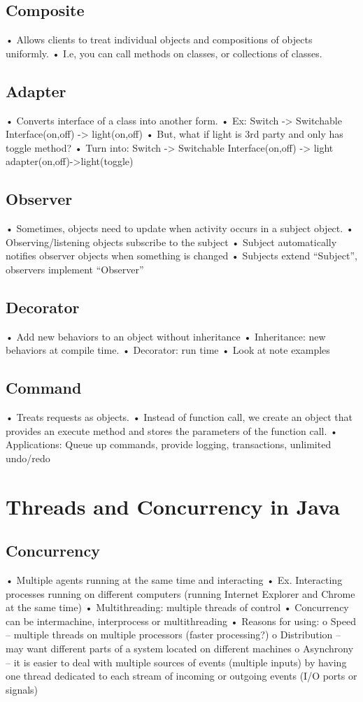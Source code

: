 \documentclass[11pt]{article}
\begin{document}
\subsection{Composite}
• Allows clients to treat individual objects and compositions of objects uniformly.
• I.e, you can call methods on classes, or collections of classes.
\subsection{Adapter}
• Converts interface of a class into another form.
• Ex: Switch -> Switchable Interface(on,off) -> light(on,off)
• But, what if light is 3rd party and only has toggle method?
• Turn into: Switch -> Switchable Interface(on,off) -> light adapter(on,off)->light(toggle)
\subsection{Observer}
• Sometimes, objects need to update when activity occurs in a subject object.
• Observing/listening objects subscribe to the subject
• Subject automatically notifies observer objects when something is changed
• Subjects extend “Subject”, observers implement “Observer”
\subsection{Decorator}
• Add new behaviors to an object without inheritance
• Inheritance: new behaviors at compile time.
• Decorator: run time
• Look at note examples
\subsection{Command}
• Treats requests as objects.
• Instead of function call, we create an object that provides an execute method and stores the
parameters of the function call.
• Applications: Queue up commands, provide logging, transactions, unlimited undo/redo
\section{Threads and Concurrency in Java}
\subsection{Concurrency}
• Multiple agents running at the same time and interacting
• Ex. Interacting processes running on different computers (running Internet Explorer and Chrome at
the same time)
• Multithreading: multiple threads of control
• Concurrency can be intermachine, interprocess or multithreading
• Reasons for using:
o Speed – multiple threads on multiple processors (faster processing?)
o Distribution – may want different parts of a system located on different machines
o Asynchrony – it is easier to deal with multiple sources of events (multiple inputs) by having
one thread dedicated to each stream of incoming or outgoing events (I/O ports or signals)
\end{document}
